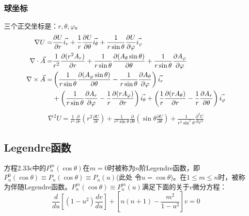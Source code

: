 \subsubsection{球坐标}
三个正交坐标是：$r, \theta, \varphi$。
\begin{subequations}\label{eqn:field sphl}
	\begin{align}
\nabla U=&\frac{\partial U}{\partial r}\vec{i_r} +\frac{1}{r}\frac{\partial U}{\partial \theta}\vec{i_{\theta}}+\frac{1}{r\sin\theta}\frac{\partial U}{\partial \varphi}\vec{i_\varphi}\\
\nabla\cdot \vec{A} =& \frac{1}{r^2}\frac{\partial{(r^2 A_r)}}{\partial r} +\frac{1}{r\sin\theta}\frac{\partial{(A_\theta \sin\theta)}}{\partial\theta}+\frac{1}{r\sin\theta}\frac{\partial{A_\varphi}}{\partial \varphi} \\
\nabla\times \vec{A}=& \left(\frac{1}{r\sin\theta}\frac{\partial{(A_\varphi \sin\theta)}}{\partial \theta} -\frac{1}{r\sin\theta}\frac{\partial{A_\theta}}{\partial \varphi}\right)\vec{i_r} \notag \\
& + \left(\frac{1}{r\sin\theta}\frac{\partial{A_r}}{\partial \varphi} -\frac{1}{r}\frac{\partial{(r A_\varphi)}}{\partial r}\right) \vec{i_\theta}
+ \left(\frac{1}{r}\frac{\partial{(r A_\theta)}}{\partial r} -\frac{1}{r}\frac{\partial{A_r}}{\partial \theta}\right)\vec{i_\varphi} 
  	\end{align}
\end{subequations}
\begin{align*}
\nabla^2 U=\frac{1}{r^2}\frac{\partial}{\partial r}\left(r^2\frac{\partial U}{\partial r}\right)+
\frac{1}{r^2\sin\theta}\frac{\partial}{\partial\theta}\left(\sin\theta\frac{\partial U}{\partial \theta}\right)+\frac{1}{r^2\sin^2\theta}\frac{\partial^2 U}{\partial \varphi^2}\tag{2.32}
\end{align*}

\subsection{Legendre函数}
方程2.33c中的$P_n^m(\cos\theta)$在$m=0$时被称为$n$阶Legendre函数，即$P_n^0(\cos\theta)\equiv P_n(\cos\theta)\equiv P_n(u)$(此处
令$u=\cos\theta$)。在$1\le m \le n$时，被称为伴随Legendre函数。$P_n^m(\cos\theta)\equiv P_n^m(u)$满足下面的关于$v$微分方程：
\begin{equation}\label{eqn:legendre diff}
  \frac{d}{du}\left[(1-u^2)\frac{dv}{du}\right]+\left[n(n+1)-\frac{m^2}{1-u^2}\right]v=0
\end{equation}

